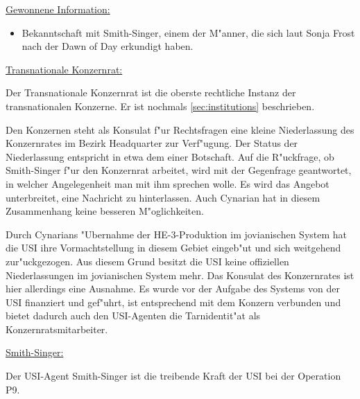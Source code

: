 \begin{remarks}
	\underline{Gewonnene Information:}
	
	\begin{itemize}
		\item Bekanntschaft mit Smith-Singer, einem der M"anner, die sich laut Sonja Frost nach der Dawn of Day erkundigt haben.
	\end{itemize}

	\underline{Transnationale Konzernrat:}

	Der Transnationale Konzernrat ist die oberste rechtliche Instanz der transnationalen Konzerne. Er ist nochmals \cref{sec:institutions} beschrieben.

	Den Konzernen steht als Konsulat f"ur Rechtsfragen eine kleine Niederlassung des Konzernrates im Bezirk Headquarter zur Verf"ugung. Der Status der Niederlassung entspricht in etwa dem einer Botschaft. Auf die R"uckfrage, ob Smith-Singer f"ur den Konzernrat arbeitet, wird mit der Gegenfrage geantwortet, in welcher Angelegenheit man mit ihm sprechen wolle. Es wird das Angebot unterbreitet, eine Nachricht zu hinterlassen. Auch Cynarian hat in diesem Zusammenhang keine besseren M"oglichkeiten.
	
	Durch Cynarians "Ubernahme der HE-3-Produktion im jovianischen System hat die USI ihre Vormachtstellung in diesem Gebiet eingeb"u\3t und sich weitgehend zur"uckgezogen. Aus diesem Grund besitzt die USI keine offiziellen Niederlassungen im jovianischen System mehr. Das Konsulat des Konzernrates ist hier allerdings eine Ausnahme. Es wurde vor der Aufgabe des Systems von der USI finanziert und gef"uhrt, ist entsprechend mit dem Konzern verbunden und bietet dadurch auch den USI-Agenten die Tarnidentit"at als Konzernratsmitarbeiter.

	\underline{Smith-Singer:}

	Der USI-Agent Smith-Singer ist die treibende Kraft der USI bei der Operation P9.
\end{remarks}
